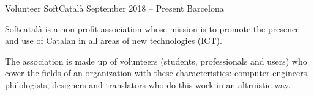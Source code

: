 

\begin{cventries}

  \cventry
    {Volunteer} %
    {SoftCatalà} %
    {September 2018 – Present} %
    {Barcelona} %
    {
      \begin{cvitems} %
        \item {Softcatalà is a non-profit association whose mission is to promote the presence and use of Catalan in all areas of new technologies (ICT).}
        \item {The association is made up of volunteers (students, professionals and users) who cover the fields of an organization with these characteristics: computer engineers, philologists, designers and translators who do this work in an altruistic way.}
      \end{cvitems}
    }


\end{cventries}
